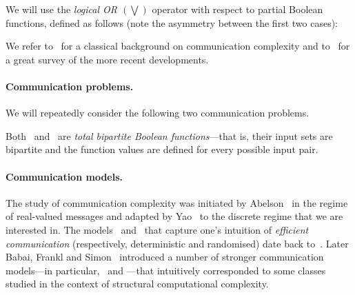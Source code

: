 We will use the \emph{logical OR $(\bigvee)$} operator with respect to partial Boolean functions, defined as follows (note the asymmetry between the first two cases):


We refer to~\cite{KN97_Comm} for a classical background on communication complexity and to~\cite{GPW18_The} for a great survey of the more recent developments.

\paragraph{Communication problems.}
We will repeatedly consider the following two communication problems.



Both \Disj\ and \IP\ are \emph{total bipartite Boolean functions}---that is, their input sets are bipartite and the function values are defined for every possible input pair.

\paragraph{Communication models.}
The study of communication complexity was initiated by Abelson~\cite{A78_Lo} in the regime of real-valued messages and adapted by Yao~\cite{Y79_So} to the discrete regime that we are interested in.
The models \Pp\ and \BPP\ that capture one's intuition of \emph{efficient communication} (respectively, deterministic and randomised) date back to~\cite{Y79_So}.
Later Babai, Frankl and Simon~\cite{BFS86_Com} introduced a number of stronger communication models---in particular, \AM\ and \MA---that intuitively corresponded to some classes studied in the context of structural computational complexity.

%
%
%
%
%
%

